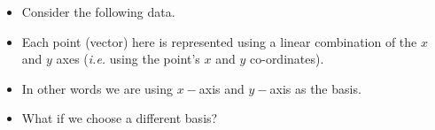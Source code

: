 \documentclass[10pt, aspectratio=169]{beamer}
\begin{document}
\begin{frame}
  \begin{columns}

    \begin{column}{0.5\textwidth}
      \centering
    \end{column}
      

    \begin{column}{0.5\textwidth}
      \begin{itemize}
        \item<1-> Consider the following data.
		\item<2-> Each point (vector) here is represented using a linear combination of the $x$ and $y$ axes (\textit{i.e.} using the point’s $x$ and $y$ co-ordinates).
		\item<3-> In other words we are using $x-$axis and $y-$axis as the basis.
		\item<4-> What if we choose a different basis?
        \end{itemize}
    \end{column}

  \end{columns}
\end{frame}
\end{document}
